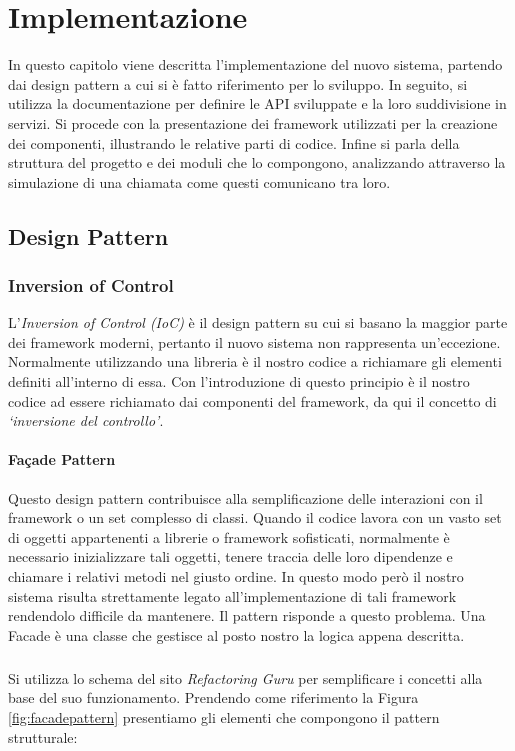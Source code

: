 \chapter{Implementazione}
In questo capitolo viene descritta l'implementazione del nuovo sistema, partendo dai design pattern a cui si è fatto riferimento per lo sviluppo. In seguito, si utilizza la documentazione per definire le API sviluppate e la loro suddivisione in servizi. Si procede con la presentazione dei framework utilizzati per la creazione dei componenti, illustrando le relative parti di codice. Infine si parla della struttura del progetto e dei moduli che lo compongono, analizzando attraverso la simulazione di una chiamata come questi comunicano tra loro.
\label{chap:implementation}

\section{Design Pattern}
\subsection{Inversion of Control}
L'\emph{Inversion of Control (IoC)} è il design pattern su cui si basano la maggior parte dei framework moderni, pertanto il nuovo sistema non rappresenta un'eccezione. Normalmente utilizzando una libreria è il nostro codice a richiamare gli elementi definiti all'interno di essa. Con l'introduzione di questo principio è il nostro codice ad essere richiamato dai componenti del framework, da qui il concetto di \emph{`inversione del controllo'}.

\subsubsection{Façade Pattern}
Questo design pattern contribuisce alla semplificazione delle interazioni con il framework o un set complesso di classi. Quando il codice lavora con un vasto set di oggetti appartenenti a librerie o framework sofisticati, normalmente è necessario inizializzare tali oggetti, tenere traccia delle loro dipendenze e chiamare i relativi metodi nel giusto ordine. In questo modo però il nostro sistema risulta strettamente legato all’implementazione di tali framework rendendolo difficile da mantenere. Il pattern risponde a questo problema. Una Facade è una classe che gestisce al posto nostro la logica appena descritta.

\paragraph{}Si utilizza lo schema del sito \emph{Refactoring Guru} \cite{refactoring:facadepattern} per semplificare i concetti alla base del suo funzionamento. Prendendo come riferimento la Figura \ref{fig:facadepattern} presentiamo gli elementi che compongono il pattern strutturale:

